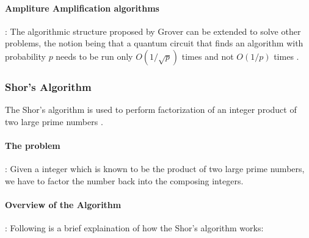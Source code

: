 \paragraph*{Ampliture Amplification algorithms}: The algorithmic structure proposed by Grover can be extended to solve other problems, the notion being that a quantum circuit that finds an algorithm with probability $p$ needs to be run only $O(1/\sqrt{p})$ times and not $O(1/p)$ times \cite{quantum-amplitude-amplification-algorithms}.

\subsubsection{Shor's Algorithm}

The Shor's algorithm is used to perform factorization of an integer product of two large prime numbers \cite{shor-quantum-algorithm-explaination}.

\paragraph*{The problem}: Given a integer which is known to be the product of two large prime numbers, we have to factor the number back into the composing integers.

\paragraph*{Overview of the Algorithm}: Following is a brief explaination of how the Shor's algorithm works:

